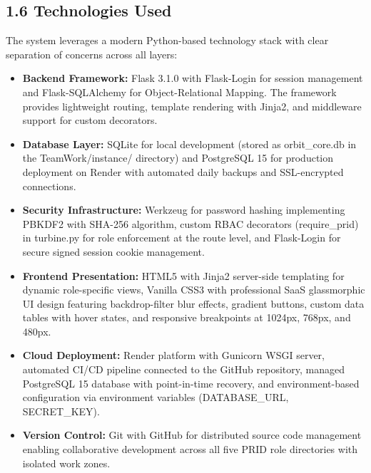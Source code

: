 ﻿\documentclass[12pt]{article}
\begin{document}
\subsection*{1.6 Technologies Used}
The system leverages a modern Python-based technology stack with clear separation of concerns across all layers:
\begin{itemize}
\item \textbf{Backend Framework:} Flask 3.1.0 with Flask-Login for session management and Flask-SQLAlchemy for Object-Relational Mapping. The framework provides lightweight routing, template rendering with Jinja2, and middleware support for custom decorators.
\item \textbf{Database Layer:} SQLite for local development (stored as orbit\_core.db in the TeamWork/instance/ directory) and PostgreSQL 15 for production deployment on Render with automated daily backups and SSL-encrypted connections.
\item \textbf{Security Infrastructure:} Werkzeug for password hashing implementing PBKDF2 with SHA-256 algorithm, custom RBAC decorators (require\_prid) in turbine.py for role enforcement at the route level, and Flask-Login for secure signed session cookie management.
\item \textbf{Frontend Presentation:} HTML5 with Jinja2 server-side templating for dynamic role-specific views, Vanilla CSS3 with professional SaaS glassmorphic UI design featuring backdrop-filter blur effects, gradient buttons, custom data tables with hover states, and responsive breakpoints at 1024px, 768px, and 480px.
\item \textbf{Cloud Deployment:} Render platform with Gunicorn WSGI server, automated CI/CD pipeline connected to the GitHub repository, managed PostgreSQL 15 database with point-in-time recovery, and environment-based configuration via environment variables (DATABASE\_URL, SECRET\_KEY).
\item \textbf{Version Control:} Git with GitHub for distributed source code management enabling collaborative development across all five PRID role directories with isolated work zones.
\end{itemize}
\end{document}
